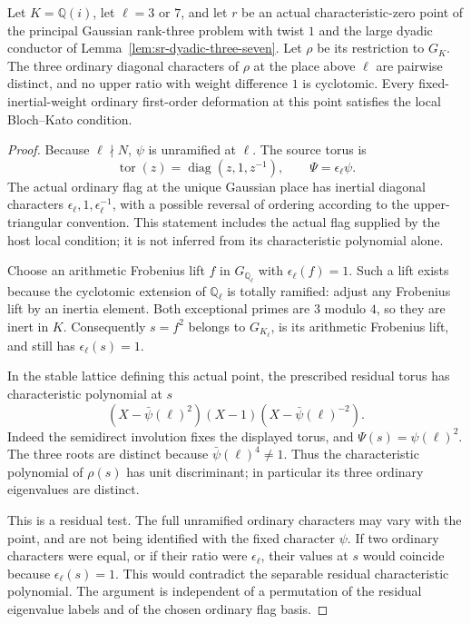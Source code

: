 \begin{srlemma}
\label{lem:sr-gaussian-local-ratios}
Let \(K=\mathbb Q(i)\), let \(\ell=3\) or \(7\), and let
\(r\) be an actual characteristic-zero point of the principal
Gaussian rank-three problem with twist \(1\) and the large
dyadic conductor of Lemma~\ref{lem:sr-dyadic-three-seven}.
Let \(\rho\) be its restriction to \(G_K\).
The three ordinary diagonal characters of \(\rho\) at the
place above \(\ell\) are pairwise distinct, and no upper
ratio with weight difference \(1\) is cyclotomic.
Every fixed-inertial-weight ordinary first-order deformation
at this point satisfies the local Bloch--Kato condition.
\end{srlemma}
\begin{proof}
Because \(\ell\nmid N\), \(\psi\) is unramified at \(\ell\).
The source torus is
\[
 \operatorname{tor}(z)=\operatorname{diag}(z,1,z^{-1}),
 \qquad \Psi=\epsilon_\ell\psi .
\]
The actual ordinary flag at the unique Gaussian place has
inertial diagonal characters
\(\epsilon_\ell,1,\epsilon_\ell^{-1}\), with a possible
reversal of ordering according to the upper-triangular
convention. This statement includes the actual flag supplied
by the host local condition; it is not inferred from its
characteristic polynomial alone.

Choose an arithmetic Frobenius lift \(f\) in \(G_{\mathbb Q_\ell}\)
with \(\epsilon_\ell(f)=1\).
Such a lift exists because the cyclotomic extension of
\(\mathbb Q_\ell\) is totally ramified: adjust any Frobenius
lift by an inertia element.
Both exceptional primes are \(3\) modulo \(4\), so they are
inert in \(K\).
Consequently \(s=f^2\) belongs to \(G_{K_\ell}\), is its
arithmetic Frobenius lift, and still has
\(\epsilon_\ell(s)=1\).

In the stable lattice defining this actual point, the
prescribed residual torus has characteristic polynomial at
\(s\)
\[
 (X-\bar\psi(\ell)^2)(X-1)
                     (X-\bar\psi(\ell)^{-2}).
\]
Indeed the semidirect involution fixes the displayed torus,
and \(\Psi(s)=\psi(\ell)^2\).
The three roots are distinct because
\(\bar\psi(\ell)^4\ne1\).
Thus the characteristic polynomial of \(\rho(s)\) has unit
discriminant; in particular its three ordinary eigenvalues
are distinct.

This is a residual test. The full unramified ordinary
characters may vary with the point, and are not being
identified with the fixed character \(\psi\).
If two ordinary characters were equal, or if their ratio
were \(\epsilon_\ell\), their values at \(s\) would coincide
because \(\epsilon_\ell(s)=1\).
This would contradict the separable residual characteristic
polynomial. The argument is independent of a permutation
of the residual eigenvalue labels and of the chosen
ordinary flag basis.


\end{proof}
